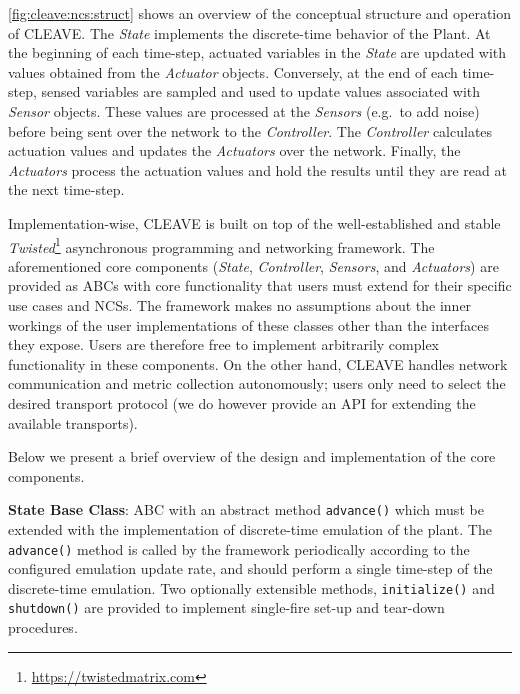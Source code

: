 \cref{fig:cleave:ncs:struct} shows an overview of the conceptual structure and operation of \ac{CLEAVE}.
The \emph{State} implements the discrete-time behavior of the Plant.
At the beginning of each time-step, actuated variables in the \emph{State} are updated with values obtained from the \emph{Actuator} objects.
Conversely, at the end of each time-step, sensed variables are sampled and used to update values associated with \emph{Sensor} objects.
These values are processed at the \emph{Sensors} (e.g.\ to add noise) before being sent over the network to the \emph{Controller}.
The \emph{Controller} calculates actuation values and updates the \emph{Actuators} over the network.
Finally, the \emph{Actuators} process the actuation values and hold the results until they are read at the next time-step.

Implementation-wise, \ac{CLEAVE} is built on top of the well-established and stable \emph{Twisted}\footnote{\url{https://twistedmatrix.com}} asynchronous programming and networking framework.
The aforementioned core components (\emph{State}, \emph{Controller}, \emph{Sensors}, and \emph{Actuators}) are provided as \acp{ABC} with core functionality that users must extend for their specific use cases and \acp{NCS}.
The framework makes no assumptions about the inner workings of the user implementations of these classes other than the interfaces they expose.
Users are therefore free to implement arbitrarily complex functionality in these components.
On the other hand, \ac{CLEAVE} handles network communication and metric collection autonomously; users only need to select the desired transport protocol (we do however provide an \ac{API} for extending the available transports).

Below we present a brief overview of the design and implementation of the core components.

\textbf{State Base Class}:
\ac{ABC} with an abstract method
\texttt{advance()} which must be extended with the implementation of discrete-time emulation of the plant.
The \texttt{advance()} method is called by the framework periodically according to the configured emulation update rate, and should perform a single time-step of the discrete-time emulation.
Two optionally extensible methods, \texttt{initialize()} and \texttt{shutdown()} are provided to implement single-fire set-up and tear-down procedures.

